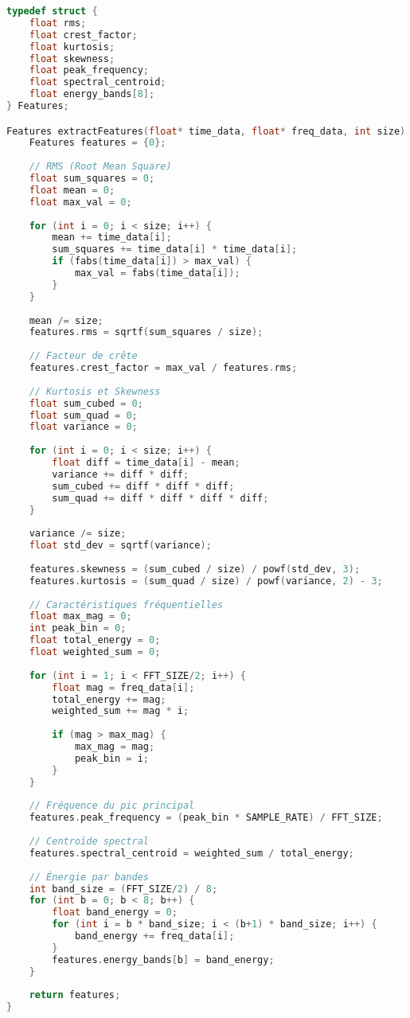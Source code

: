 \begin{lstlisting}[language=C, caption=Extraction des caractéristiques temporelles et fréquentielles]
typedef struct {
    float rms;
    float crest_factor;
    float kurtosis;
    float skewness;
    float peak_frequency;
    float spectral_centroid;
    float energy_bands[8];
} Features;

Features extractFeatures(float* time_data, float* freq_data, int size) {
    Features features = {0};
    
    // RMS (Root Mean Square)
    float sum_squares = 0;
    float mean = 0;
    float max_val = 0;
    
    for (int i = 0; i < size; i++) {
        mean += time_data[i];
        sum_squares += time_data[i] * time_data[i];
        if (fabs(time_data[i]) > max_val) {
            max_val = fabs(time_data[i]);
        }
    }
    
    mean /= size;
    features.rms = sqrtf(sum_squares / size);
    
    // Facteur de crête
    features.crest_factor = max_val / features.rms;
    
    // Kurtosis et Skewness
    float sum_cubed = 0;
    float sum_quad = 0;
    float variance = 0;
    
    for (int i = 0; i < size; i++) {
        float diff = time_data[i] - mean;
        variance += diff * diff;
        sum_cubed += diff * diff * diff;
        sum_quad += diff * diff * diff * diff;
    }
    
    variance /= size;
    float std_dev = sqrtf(variance);
    
    features.skewness = (sum_cubed / size) / powf(std_dev, 3);
    features.kurtosis = (sum_quad / size) / powf(variance, 2) - 3;
    
    // Caractéristiques fréquentielles
    float max_mag = 0;
    int peak_bin = 0;
    float total_energy = 0;
    float weighted_sum = 0;
    
    for (int i = 1; i < FFT_SIZE/2; i++) {
        float mag = freq_data[i];
        total_energy += mag;
        weighted_sum += mag * i;
        
        if (mag > max_mag) {
            max_mag = mag;
            peak_bin = i;
        }
    }
    
    // Fréquence du pic principal
    features.peak_frequency = (peak_bin * SAMPLE_RATE) / FFT_SIZE;
    
    // Centroïde spectral
    features.spectral_centroid = weighted_sum / total_energy;
    
    // Énergie par bandes
    int band_size = (FFT_SIZE/2) / 8;
    for (int b = 0; b < 8; b++) {
        float band_energy = 0;
        for (int i = b * band_size; i < (b+1) * band_size; i++) {
            band_energy += freq_data[i];
        }
        features.energy_bands[b] = band_energy;
    }
    
    return features;
}
\end{lstlisting}

